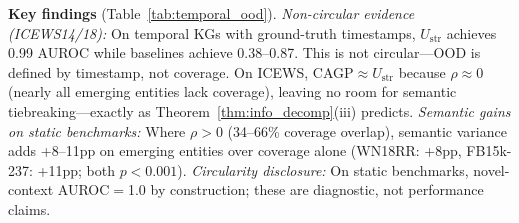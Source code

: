 \begin{table}[t]
\centering
\caption{\textbf{Temporal OOD detection} ($\tau{=}25^{\text{th}}$ pctl, multi-seed mean$\pm$std). Em.\ = emerging-entity AUROC; All = overall. $^\ddagger$Simulated splits. $^*$Ground-truth temporal splits.\label{tab:temporal_ood}}
\end{table}

\textbf{Key findings} (Table~\ref{tab:temporal_ood}). \emph{Non-circular evidence (ICEWS14/18):} On temporal KGs with ground-truth timestamps, $U_{\text{str}}$ achieves 0.99 AUROC while baselines achieve 0.38--0.87. This is not circular---OOD is defined by timestamp, not coverage. On ICEWS, CAGP$\approx U_{\text{str}}$ because $\rho \approx 0$ (nearly all emerging entities lack coverage), leaving no room for semantic tiebreaking---exactly as Theorem~\ref{thm:info_decomp}(iii) predicts. \emph{Semantic gains on static benchmarks:} Where $\rho > 0$ (34--66\% coverage overlap), semantic variance adds +8--11pp on emerging entities over coverage alone (WN18RR: +8pp, FB15k-237: +11pp; both $p < 0.001$). \emph{Circularity disclosure:} On static benchmarks, novel-context AUROC$=$1.0 by construction; these are diagnostic, not performance claims.

